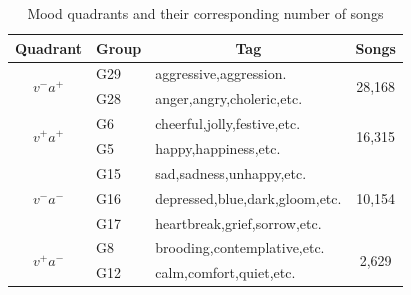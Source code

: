 \documentclass{llncs}
\begin{document}
\begin{table}
	\centering
	\caption{Mood quadrants and their corresponding number of songs}
	\label{tb:clas-scheme}
	\begin{tabular}{|c|l|l|c|}
		\hline
		\textbf{Quadrant}               & \multicolumn{1}{c|}{\textbf{Group}} & \multicolumn{1}{c|}{\textbf{Tag}} & \textbf{Songs}         \\ \hline
		\multirow{2}{*}{$v^{-}a^{+}$} & G29                                 & aggressive,aggression.            & \multirow{2}{*}{28,168} \\ \cline{2-3}
		& G28                                 & anger,angry,choleric,etc.         &                         \\ \hline
		\multirow{2}{*}{$v^{+}a^{+}$} & G6                                  & cheerful,jolly,festive,etc.       & \multirow{2}{*}{16,315} \\ \cline{2-3}
		& G5                                  & happy,happiness,etc.              &                         \\ \hline
		\multirow{3}{*}{$v^{-}a^{-}$} & G15                                 & sad,sadness,unhappy,etc.          & \multirow{3}{*}{10,154} \\ \cline{2-3}
		& G16                                 & depressed,blue,dark,gloom,etc.    &                         \\ \cline{2-3}
		& G17                                 & heartbreak,grief,sorrow,etc.      &                         \\ \hline
		\multirow{2}{*}{$v^{+}a^{-}$}  & G8                                  & brooding,contemplative,etc.       & \multirow{2}{*}{2,629}  \\ \cline{2-3}
		& G12                                 & calm,comfort,quiet,etc.           &                         \\ \hline
	\end{tabular}
\end{table}

\end{document}
